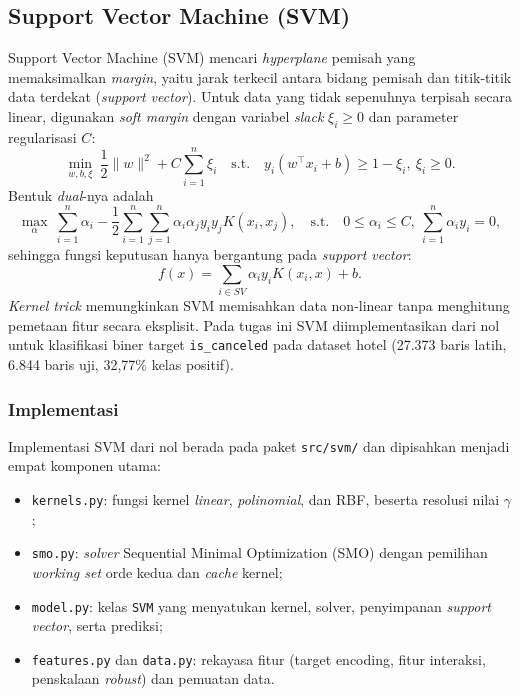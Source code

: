 \subsection{Support Vector Machine (SVM)}

Support Vector Machine (SVM) mencari \textit{hyperplane} pemisah yang memaksimalkan
\textit{margin}, yaitu jarak terkecil antara bidang pemisah dan titik-titik data
terdekat (\textit{support vector}). Untuk data yang tidak sepenuhnya terpisah
secara linear, digunakan \textit{soft margin} dengan variabel \textit{slack}
$\xi_i \ge 0$ dan parameter regularisasi $C$:
\[
\min_{w,b,\xi}\ \frac{1}{2}\lVert w \rVert^2 + C\sum_{i=1}^n \xi_i
\quad \text{s.t.}\quad y_i(w^\top x_i + b) \ge 1 - \xi_i,\ \xi_i \ge 0 .
\]
Bentuk \textit{dual}-nya adalah
\[
\max_{\alpha}\ \sum_{i=1}^n \alpha_i
- \frac{1}{2}\sum_{i=1}^n\sum_{j=1}^n \alpha_i\alpha_j y_i y_j K(x_i,x_j),
\quad
\text{s.t.}\quad 0 \le \alpha_i \le C,\ \sum_{i=1}^n \alpha_i y_i = 0,
\]
sehingga fungsi keputusan hanya bergantung pada \textit{support vector}:
\[
f(x) = \sum_{i \in SV}\alpha_i y_i K(x_i,x) + b .
\]
\textit{Kernel trick} memungkinkan SVM memisahkan data non-linear tanpa
menghitung pemetaan fitur secara eksplisit. Pada tugas ini SVM diimplementasikan
dari nol untuk klasifikasi biner target \texttt{is\_canceled} pada dataset hotel
(27.373 baris latih, 6.844 baris uji, 32,77\% kelas positif).

\subsubsection{Implementasi}

Implementasi SVM dari nol berada pada paket \texttt{src/svm/} dan dipisahkan
menjadi empat komponen utama:
\begin{itemize}
  \item \texttt{kernels.py}: fungsi kernel \textit{linear}, \textit{polinomial},
        dan RBF, beserta resolusi nilai $\gamma$;
  \item \texttt{smo.py}: \textit{solver} Sequential Minimal Optimization (SMO)
        dengan pemilihan \textit{working set} orde kedua dan \textit{cache} kernel;
  \item \texttt{model.py}: kelas \texttt{SVM} yang menyatukan kernel, solver,
        penyimpanan \textit{support vector}, serta prediksi;
  \item \texttt{features.py} dan \texttt{data.py}: rekayasa fitur (target
        encoding, fitur interaksi, penskalaan \textit{robust}) dan pemuatan data.
\end{itemize}


